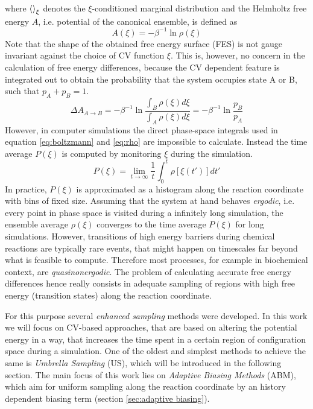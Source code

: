 where $\braket{}_\xi$ denotes the $\xi$-conditioned marginal distribution and the Helmholtz free energy $A$, i.e. potential of the canonical ensemble, is defined as
\begin{equation}
  A(\xi) = -\beta^{-1}\ln \rho(\xi)
  \label{eq:free energy}
\end{equation}
Note that the shape of the obtained free energy surface (FES) is not gauge invariant against the choice of CV function $\xi$. This is, however, no concern in the calculation of free energy differences, because the CV dependent feature is integrated out to obtain the probability that the system occupies state A or B, such that $p_A + p_B = 1$.\autocite{bal2020free}
\begin{equation}
  \Delta A_{A\rightarrow B} = -\beta^{-1}\ln \frac{\int_B \rho(\xi)d\xi}{\int_A \rho(\xi)d\xi}=-\beta^{-1}\ln \frac{p_B}{p_A}
  \label{eq:free energy diff}
\end{equation}
However, in computer simulations the direct phase-space integrals used in equation \ref{eq:boltzmann} and \ref{eq:rho} are impossible to calculate.\autocite{chipot2007free} Instead the time average $P(\xi)$ is computed by monitoring $\xi$ during the simulation.
\begin{equation}
  P(\xi)=\lim_{t\rightarrow \infty}\frac{1}{t} \int_0^t \rho[\xi (t')] dt'
  \label{eq:ergodic}
\end{equation}
In practice, $P(\xi)$ is approximated as a histogram along the reaction coordinate with bins of fixed size.
Assuming that the system at hand behaves \textit{ergodic}, i.e. every point in phase space is visited during a infinitely long simulation, the ensemble average $\rho(\xi)$ converges to the time average $P(\xi)$ for long simulations. However, transitions of high energy barriers during chemical reactions are typically rare events, that might happen on timescales far beyond what is feasible to compute. Therefore most processes, for example in biochemical context, are \textit{quasinonergodic}. The problem of calculating accurate free energy differences hence really consists in adequate sampling of regions with high free energy (transition states) along the reaction coordinate.

For this purpose several \textit{enhanced sampling} methods were developed.\autocite{jiang2010free, sugita1999replica,den2000thermodynamic, kastner2011umbrella, ciccotti2005blue, barducci2008well}
In this work we will focus on CV-based approaches, that are based on altering the potential energy in a way, that increases the time spent in a certain region of configuration space during a simulation. One of the oldest and simplest methods to achieve the same is \textit{Umbrella Sampling} (US)\autocite{kastner2011umbrella}, which will be introduced in the following section.
The main focus of this work lies on \textit{Adaptive Biasing Methods} (ABM)\autocite{barducci2011metadynamics,comer2015adaptive, lesage2017smoothed}, which aim for uniform sampling along the reaction coordinate by an history dependent biasing term (section \ref{sec:adaptive biasing}).

